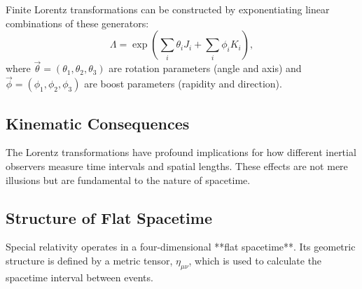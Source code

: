 \documentclass{amsart}
\theoremstyle{definition}
\theoremstyle{remark}
\begin{document}
Finite Lorentz transformations can be constructed by exponentiating linear combinations of these generators:
\begin{equation*}
\Lambda = \exp\left(\sum_i \theta_i J_i + \sum_i \phi_i K_i \right),
\end{equation*}
where $\vec{\theta} = (\theta_1, \theta_2, \theta_3)$ are rotation parameters (angle and axis) and $\vec{\phi} = (\phi_1, \phi_2, \phi_3)$ are boost parameters (rapidity and direction).

\subsection{Kinematic Consequences}
\label{subsec:sr_kinematics}
The Lorentz transformations have profound implications for how different inertial observers measure time intervals and spatial lengths. These effects are not mere illusions but are fundamental to the nature of spacetime.

\subsection{Structure of Flat Spacetime}
\label{subsec:sr_structure}
Special relativity operates in a four-dimensional **flat spacetime**. Its geometric structure is defined by a metric tensor, $\eta_{\mu\nu}$, which is used to calculate the spacetime interval between events.
\end{document}
